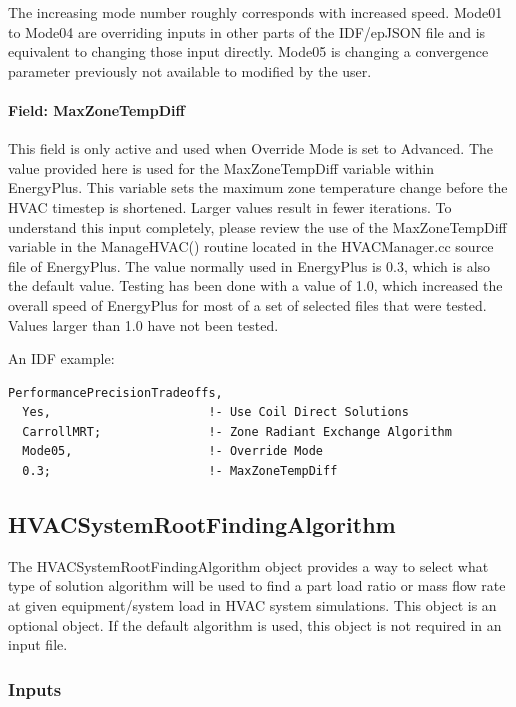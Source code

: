 The increasing mode number roughly corresponds with increased speed. Mode01 to Mode04 are overriding inputs in other parts of the IDF/epJSON file and is equivalent to changing those input directly. Mode05 is changing a convergence parameter previously not available to modified by the user.

\paragraph{Field: MaxZoneTempDiff}\label{max-zone-temp-diff}

This field is only active and used when Override Mode is set to Advanced. The value provided here is used for the MaxZoneTempDiff variable within EnergyPlus. This variable sets the maximum zone temperature change before the HVAC timestep is shortened. Larger values result in fewer iterations. To understand this input completely, please review the use of the MaxZoneTempDiff variable in the ManageHVAC() routine located in the HVACManager.cc source file of EnergyPlus. The value normally used in EnergyPlus is 0.3, which is also the default value. Testing has been done with a value of 1.0, which increased the overall speed of EnergyPlus for most of a set of selected files that were tested. Values larger than 1.0 have not been tested.


An IDF example:

\begin{lstlisting}
PerformancePrecisionTradeoffs,
  Yes,                      !- Use Coil Direct Solutions
  CarrollMRT;               !- Zone Radiant Exchange Algorithm
  Mode05,                   !- Override Mode
  0.3;                      !- MaxZoneTempDiff
\end{lstlisting}

\subsection{HVACSystemRootFindingAlgorithm}\label{hvacystemrootfindingalgorithm}

The HVACSystemRootFindingAlgorithm object provides a way to select what type of solution
algorithm will be used to find a part load ratio or mass flow rate at given equipment/system load in HVAC system simulations. This object is an optional object. If the default algorithm is used, this object is not required in an input file.


\subsubsection{Inputs}\label{inputs-hvacystemrootfindingalgorithm}

